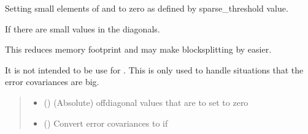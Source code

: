 \documentclass[letterpaper,10pt,english]{sphinxmanual}
\begin{document}
\begin{fulllineitems}
\begin{fulllineitems}
\label{\detokenize{kalman:glomar_gridding.autoregressive_kalman.KalmanOut.sparse_approx_for_errcov}}
\pysigstartsignatures
\pysiglinewithargsret
{}
{\sphinxparamcomma {}}
{}
\pysigstopsignatures
\sphinxAtStartPar
Setting small elements of  and 
to zero as defined by sparse\_threshold value.

\sphinxAtStartPar
If there are small values in the diagonals.

\sphinxAtStartPar
This reduces memory footprint and may make block\sphinxhyphen{}splitting
by  easier.

\sphinxAtStartPar
It is not intended to be use for .
This is only used to handle situations that the error covariances
are big.
\begin{quote}\begin{description}
\begin{itemize}
\item {}
\sphinxAtStartPar
{} () \textendash{} (Absolute) off\sphinxhyphen{}diagonal values that are to set to zero

\item {}
\sphinxAtStartPar
{} () \textendash{} Convert error covariances to  if 

\end{itemize}

\end{description}\end{quote}

\end{fulllineitems}


\end{fulllineitems}

\end{document}

